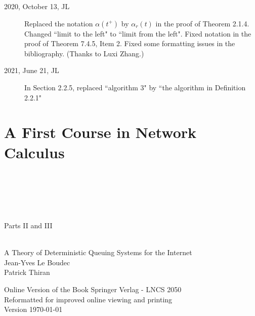 \documentclass[11pt,twoside,onecolumn,a4paper]{book}
\begin{document}
\begin{description}
        \item[2020, October 13, JL] Replaced the notation $\alpha(t^+)$ by $\alpha_r(t)$ in the proof of Theorem 2.1.4. Changed ``limit to the left" to ``limit from the left". Fixed notation in the proof of Theorem 7.4.5, Item 2. Fixed some formatting issues in the bibliography. (Thanks to Luxi Zhang.)
        \item[2021, June 21, JL] In Section 2.2.5, replaced ``algorithm 3" by ``the algorithm in Definition 2.2.1"


\end{description}






\tableofcontents








 \mainmatter
\part{A First Course in Network Calculus}
\newpage
\thispagestyle{plain}
\chapter*{~}
\begin{center}


 \\
 ~\\
 {\Huge {  Parts II and III  }}\\ ~\\
 {\LARGE
 A Theory of Deterministic Queuing Systems for the Internet\\


 {\sc Jean-Yves Le Boudec}  \\{\sc Patrick Thiran}\\
 \vspace{3cm}

 Online Version of the Book Springer Verlag - LNCS 2050\\
 Reformatted for improved online viewing and printing\\



 Version \today
 }


\end{center}
\end{document}
